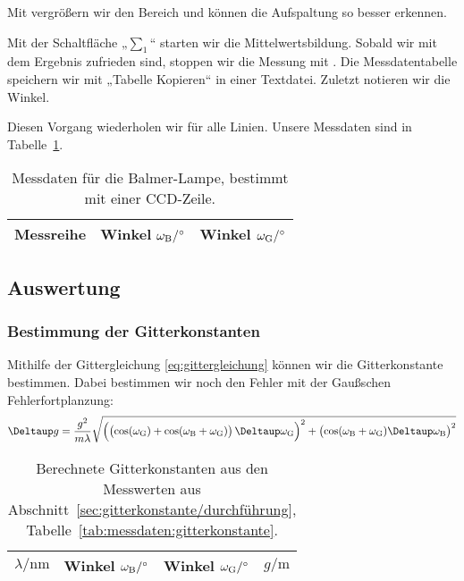 Mit \Alt{} vergrößern wir den Bereich und können die Aufspaltung so
besser erkennen.

Mit der Schaltfläche „$\sum_1$“ starten wir die Mittelwertsbildung. Sobald wir
mit dem Ergebnis zufrieden sind, stoppen wir die Messung mit .
Die Messdatentabelle speichern wir mit „Tabelle Kopieren“ in einer Textdatei.
Zuletzt notieren wir die Winkel.

Diesen Vorgang wiederholen wir für alle Linien. Unsere Messdaten sind in
Tabelle~\ref{tab:messdaten:balmer-ccd}.

\begin{table}[htbp]
    \centering
    \begin{tabular}{SSS}
        {Messreihe} & {Winkel $\omegaB / \si\degree$}  & {Winkel $\omegaG /
    \si\degree$} \\
        \hline
    \end{tabular}
    \caption{%
        Messdaten für die Balmer-Lampe, bestimmt mit einer CCD-Zeile.
    }
    \label{tab:messdaten:balmer-ccd}
\end{table}

\FloatBarrier
\subsection{Auswertung}

\FloatBarrier
\subsubsection{Bestimmung der Gitterkonstanten}

Mithilfe der Gittergleichung \eqref{eq:gittergleichung} können wir die
Gitterkonstante bestimmen. Dabei bestimmen wir noch den Fehler mit der
Gaußschen Fehlerfortplanzung:
\[
    \Deltaup g
    = \frac{g^2}{m\lambda} \sqrt{
        \del{\del{\cos(\omegaG) + \cos(\omegaB +
        \omegaG)} \Deltaup \omegaG}^2
        +
        \del{\cos(\omegaB + \omegaG) \Deltaup \omegaB}^2
    }
\]

\begin{table}[htbp]
    \centering
    \begin{tabular}{SSS|S}
        {$\lambda / \si{\nano\meter}$} & {Winkel $\omegaB / \si\degree$}  & {Winkel
    $\omegaG / \si\degree$} & {$g / \si{\meter}$} \\
        \hline
    \end{tabular}
    \caption{%
        Berechnete Gitterkonstanten aus den Messwerten aus
        Abschnitt~\ref{sec:gitterkonstante/durchführung},
        Tabelle~\ref{tab:messdaten:gitterkonstante}.
    }
    \label{tab:gitterkonstanten}
\end{table}

